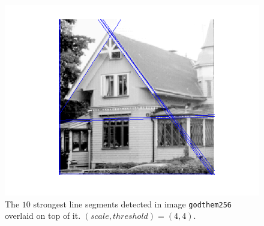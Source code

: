     \begin{figure}[H]
      \centering
      \includegraphics[scale=0.8]{./images/Q8/godthem256/1.png}
      \caption{The $10$ strongest line segments detected in image
        \texttt{godthem256} overlaid on top of it. $(scale, threshold) = (4,4)$.}
      \label{fig:Q8_godthem256_1}
    \end{figure}

